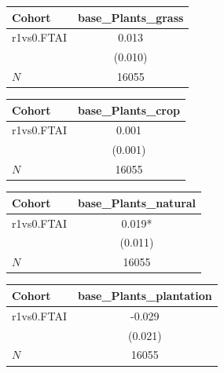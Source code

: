 {
\def\sym#1{\ifmmode^{#1}\else\(^{#1}\)\fi}
\begin{tabular}{l*{1}{c}}
\toprule
Cohort    &base\_Plants\_grass   \\
\midrule
r1vs0.FTAI&    0.013   \\
          &  (0.010)   \\
\midrule
\(N\)     &    16055   \\
\bottomrule
\end{tabular}
}
{
\def\sym#1{\ifmmode^{#1}\else\(^{#1}\)\fi}
\begin{tabular}{l*{1}{c}}
\toprule
Cohort    &base\_Plants\_crop   \\
\midrule
r1vs0.FTAI&    0.001   \\
          &  (0.001)   \\
\midrule
\(N\)     &    16055   \\
\bottomrule
\end{tabular}
}
{
\def\sym#1{\ifmmode^{#1}\else\(^{#1}\)\fi}
\begin{tabular}{l*{1}{c}}
\toprule
Cohort    &base\_Plants\_natural   \\
\midrule
r1vs0.FTAI&    0.019*  \\
          &  (0.011)   \\
\midrule
\(N\)     &    16055   \\
\bottomrule
\end{tabular}
}
{
\def\sym#1{\ifmmode^{#1}\else\(^{#1}\)\fi}
\begin{tabular}{l*{1}{c}}
\toprule
Cohort    &base\_Plants\_plantation   \\
\midrule
r1vs0.FTAI&   -0.029   \\
          &  (0.021)   \\
\midrule
\(N\)     &    16055   \\
\bottomrule
\end{tabular}
}
